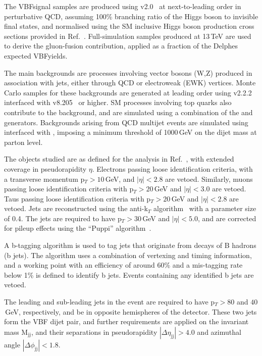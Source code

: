 \documentclass[../report.tex]{subfiles}
\begin{document}
The VBF\PH signal samples are produced using \POWHEG
v2.0~\cite{Alioli:2010xd,Nason:2009ai} at next-to-leading order
in perturbative QCD, assuming 100\% branching ratio \BHinv of the Higgs boson
to invisible final states, and normalised using the SM inclusive Higgs
boson production cross sections provided in Ref.~\cite{deFlorian:2016spz}.  Full-simulation samples produced at 13\,TeV are used to derive the gluon-fusion contribution, applied as a fraction of the Delphes expected VBF\PH yields.

The main backgrounds are processes involving vector bosons (W,Z)
produced in association with jets, either through QCD or electroweak
(EWK) vertices.  Monte Carlo samples for these backgrounds are
generated at leading order using \MGvATNLO v2.2.2~\cite{Alwall:2014hca} interfaced with \PYTHIA v8.205~\cite{Sjostrand:2014zea} or higher. SM processes involving top quarks also contribute to the
background, and are simulated using a combination of the \POWHEG and \MGvATNLO generators. Backgrounds arising from QCD multijet events are simulated using \MGvATNLO interfaced with \PYTHIA, imposing a minimum threshold of 1000\,GeV on the dijet mass at parton level.


The objects studied are as defined for the analysis in Ref.~\cite{Sirunyan:2018owy}, with extended coverage in pseudorapidity $\eta$. Electrons passing loose
identification criteria, with a transverse momentum p$_T>10$\,GeV, and $|\eta|<2.8$ are vetoed. Similarly, muons passing loose
identification criteria with p$_T>20$\,GeV and $|\eta|<3.0$ are
vetoed. Taus passing loose identification criteria with p$_T>20$\,GeV
and $|\eta|<2.8$ are vetoed. Jets are reconstructed using the
anti-k$_T$ algorithm~\cite{Cacciari:2008gp,Cacciari:2011ma} with a parameter size of
0.4.  The jets are required to have p$_T>30$\,GeV and $|\eta|<5.0$,
and are corrected for pileup effects using the ``Puppi''
algorithm~\cite{Bertolini:2014bba}.

 A b-tagging algorithm is used to tag jets that originate from decays
of B hadrons (b jets).  The algorithm uses a combination of vertexing
and timing information, and a working point with an efficiency of
around 60\% and a mis-tagging rate below 1\% is defined to identify b
jets.  Events containing any identified b jets are vetoed.

The leading and sub-leading jets in the event are required to have
p$_{T}>80$ and $40$\,GeV, respectively, and be in opposite hemispheres of
the detector. These two jets form the VBF dijet pair, and further
requirements are applied on the invariant mass M$_{\text{jj}}$, and
their separations in pseudorapidity $|\Delta\eta_{\text{jj}}|>4.0$ and
azimuthal angle $|\Delta\phi_{\text{jj}}|<1.8$.
\end{document}
